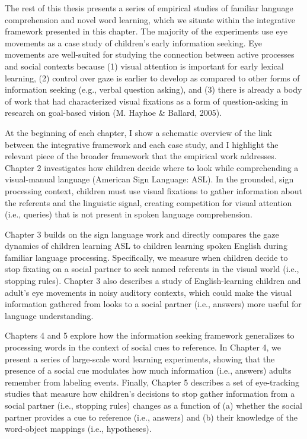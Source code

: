 \documentclass[oneside]{report}
\begin{document}
The rest of this thesis presents a series of empirical studies of
familiar language comprehension and novel word learning, which we
situate within the integrative framework presented in this chapter. The
majority of the experiments use eye movements as a case study of
children's early information seeking. Eye movements are well-suited for
studying the connection between active processes and social contexts
because (1) visual attention is important for early lexical learning,
(2) control over gaze is earlier to develop as compared to other forms
of information seeking (e.g., verbal question asking), and (3) there is
already a body of work that had characterized visual fixations as a form
of question-asking in research on goal-based vision (M. Hayhoe \&
Ballard, 2005).

At the beginning of each chapter, I show a schematic overview of the
link between the integrative framework and each case study, and I
highlight the relevant piece of the broader framework that the empirical
work addresses. Chapter 2 investigates how children decide where to look
while comprehending a visual-manual language (American Sign Language:
ASL). In the grounded, sign processing context, children must use visual
fixations to gather information about the referents and the linguistic
signal, creating competition for visual attention (i.e., queries) that
is not present in spoken language comprehension.

Chapter 3 builds on the sign language work and directly compares the
gaze dynamics of children learning ASL to children learning spoken
English during familiar language processing. Specifically, we measure
when children decide to stop fixating on a social partner to seek named
referents in the visual world (i.e., stopping rules). Chapter 3 also
describes a study of English-learning children and adult's eye movements
in noisy auditory contexts, which could make the visual information
gathered from looks to a social partner (i.e., answers) more useful for
language understanding.

Chapters 4 and 5 explore how the information seeking framework
generalizes to processing words in the context of social cues to
reference. In Chapter 4, we present a series of large-scale word
learning experiments, showing that the presence of a social cue
modulates how much information (i.e., answers) adults remember from
labeling events. Finally, Chapter 5 describes a set of eye-tracking
studies that measure how children's decisions to stop gather information
from a social partner (i.e., stopping rules) changes as a function of
(a) whether the social partner provides a cue to reference (i.e.,
answers) and (b) their knowledge of the word-object mappings (i.e.,
hypotheses).
\end{document}

